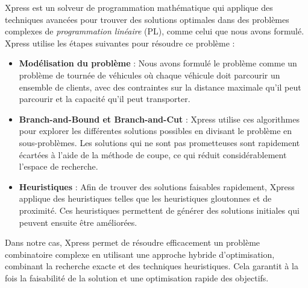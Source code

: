 \documentclass[a4paper, 12pt, DIV=12]{scrartcl}
\begin{document}
Xpress est un solveur de programmation mathématique qui applique des techniques avancées pour trouver des solutions optimales dans des problèmes complexes de \textit{programmation linéaire} (PL), comme celui que nous avons formulé. \\[10pt]

Xpress utilise les étapes suivantes pour résoudre ce problème : \\[10pt]

\begin{itemize}
    \item \textbf{Modélisation du problème} : Nous avons formulé le problème comme un problème de tournée de véhicules où chaque véhicule doit parcourir un ensemble de clients, avec des contraintes sur la distance maximale qu'il peut parcourir et la capacité qu'il peut transporter.\\[10pt]
    \item \textbf{Branch-and-Bound et Branch-and-Cut} : Xpress utilise ces algorithmes pour explorer les différentes solutions possibles en divisant le problème en sous-problèmes. Les solutions qui ne sont pas prometteuses sont rapidement écartées à l'aide de la méthode de coupe, ce qui réduit considérablement l'espace de recherche.\\[10pt]
    \item \textbf{Heuristiques} : Afin de trouver des solutions faisables rapidement, Xpress applique des heuristiques telles que les heuristiques gloutonnes et de proximité. Ces heuristiques permettent de générer des solutions initiales qui peuvent ensuite être améliorées.\\[10pt]
\end{itemize}

Dans notre cas, Xpress permet de résoudre efficacement un problème combinatoire complexe en utilisant une approche hybride d'optimisation, combinant la recherche exacte et des techniques heuristiques. 
Cela garantit à la fois la faisabilité de la solution et une optimisation rapide des objectifs.\\[10pt]
\newpage
\end{document}
